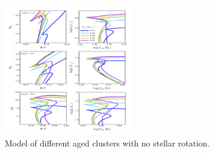 \documentclass[a4paper, 12pt]{article}
\begin{document}
\begin{figure}[h]
    \centering
    \includegraphics[width=0.5\textwidth]{fig1.png}
    \caption{Model of different aged clusters with no stellar rotation.}
    \label{fig:mesh1}
\end{figure}
\end{document}
